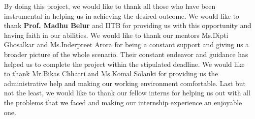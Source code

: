 \newpage
\thispagestyle{empty}
\begin{center}
\end{center}
\vspace{4.5cm}

By doing this project, we would like to thank all those who have been instrumental in helping us in achieving the desired outcome. We would like to thank \textbf{Prof. Madhu Belur} and IITB for providing us with this opportunity and having faith in our abilities. We would like to thank our mentors Ms.Dipti Ghosalkar and Ms.Inderpreet Arora for being a constant support and giving us a broader picture of the whole scenario. Their constant endeavor and guidance has helped us to complete the project within the stipulated deadline. We would like to thank Mr.Bikas Chhatri and Ms.Komal Solanki for providing us the administrative help and making our working environment comfortable. Last but not the least, we would like to thank our fellow interns for helping us out with all the problems that we faced and making our internship
experience an enjoyable one.
